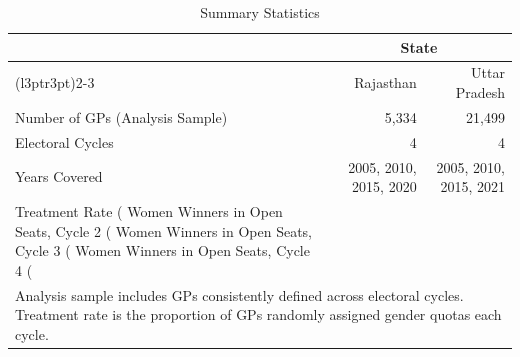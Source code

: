 \begin{table}[!h]
\centering
\caption{\label{tab:tab:summary_stats}Summary Statistics}
\centering
\begin{tabular}[t]{lrr}
\toprule
\multicolumn{1}{c}{ } & \multicolumn{2}{c}{State} \\
\cmidrule(l{3pt}r{3pt}){2-3}
 & Rajasthan & Uttar Pradesh\\
\midrule
Number of GPs (Analysis Sample) & 5,334 & 21,499\\
Electoral Cycles & 4 & 4\\
Years Covered & 2005, 2010, 2015, 2020 & 2005, 2010, 2015, 2021\\
Treatment Rate (%
Women Winners in Open Seats, Cycle 2 (%
\addlinespace
Women Winners in Open Seats, Cycle 3 (%
Women Winners in Open Seats, Cycle 4 (%
\bottomrule
\multicolumn{3}{l}{\rule{0pt}{1em}\textit{Note: }}\\
\multicolumn{3}{l}{\rule{0pt}{1em}Analysis sample includes GPs consistently defined across electoral cycles. Treatment rate is the proportion of GPs randomly assigned gender quotas each cycle.}\\
\end{tabular}
\end{table}
